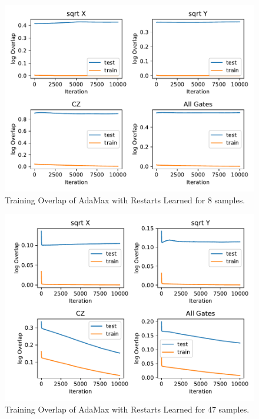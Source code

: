 \begin{figure}[H]
  \centering
  \includegraphics[width=\textwidth]{figures/results/AM-restarts-learned/avgOverlap_8.pdf}
  \caption[Training Overlap of AdaMax with Restarts Learned]{Training 
  Overlap of AdaMax with Restarts Learned for 8 samples.}
  \label{fig:sr_tvd}
\end{figure}

\begin{figure}[H]
  \centering
  \includegraphics[width=\textwidth]{figures/results/AM-restarts-learned/avgOverlap_47.pdf}
  \caption[Training Overlap of AdaMax with Restarts Learned]{Training 
  Overlap of AdaMax with Restarts Learned for 47 samples.}
  \label{fig:sr_tvd}
\end{figure}

